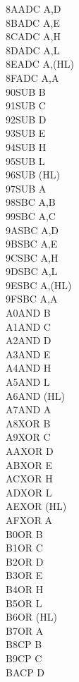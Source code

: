 \begin{multicols}{3}
{\begin{tabbing}
	8A\>ADC A,D\\
	8B\>ADC A,E\\
	8C\>ADC A,H\\
	8D\>ADC A,L\\
	8E\>ADC A,(HL)\\
	8F\>ADC A,A\\
	90\>SUB B\\
	91\>SUB C\\
	92\>SUB D\\
	93\>SUB E\\
	94\>SUB H\\
	95\>SUB L\\
	96\>SUB (HL)\\
	97\>SUB A\\
	98\>SBC A,B\\
	99\>SBC A,C\\
	9A\>SBC A,D\\
	9B\>SBC A,E\\
	9C\>SBC A,H\\
	9D\>SBC A,L\\
	9E\>SBC A,(HL)\\
	9F\>SBC A,A\\
	A0\>AND B\\
	A1\>AND C\\
	A2\>AND D\\
	A3\>AND E\\
	A4\>AND H\\
	A5\>AND L\\
	A6\>AND (HL)\\
	A7\>AND A\\
	A8\>XOR B\\
	A9\>XOR C\\
	AA\>XOR D\\
	AB\>XOR E\\
	AC\>XOR H\\
	AD\>XOR L\\
	AE\>XOR (HL)\\
	AF\>XOR A\\
	B0\>OR B\\
	B1\>OR C\\
	B2\>OR D\\
	B3\>OR E\\
	B4\>OR H\\
	B5\>OR L\\
	B6\>OR (HL)\\
	B7\>OR A\\
	B8\>CP B\\
	B9\>CP C\\
	BA\>CP D\\

\end{tabbing}}
\end{multicols}
